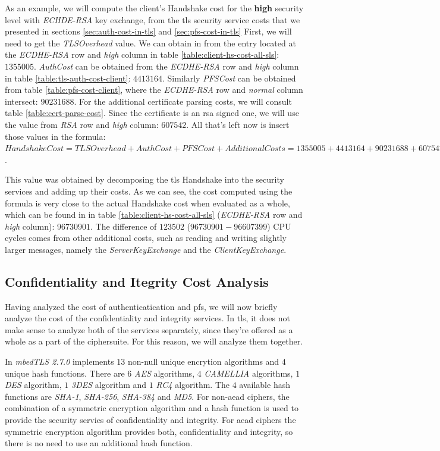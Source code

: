 \documentclass{llncs}
\begin{document}
As an example, we will compute the client's Handshake cost for the \textbf{high} security level with \textit{ECHDE-RSA}
key exchange, from the \gls{tls} security service costs that we presented in sections \ref{sec:auth-cost-in-tls} and \ref{sec:pfs-cost-in-tls}
First, we will need to get the \textit{TLSOverhead} value. We can obtain in from the entry located at the
\textit{ECDHE-RSA} row and \textit{high} column in table \ref{table:client-hs-cost-all-sls}: $1355005$. \textit{AuthCost} can be obtained
from the \textit{ECDHE-RSA} row and \textit{high} column in table \ref{table:tls-auth-cost-client}: $4413164$. Similarly \textit{PFSCost}
can be obtained from table \ref{table:pfs-cost-client}, where the \textit{ECDHE-RSA} row and \textit{normal} column intersect: $90231688$.
For the additional certificate parsing costs, we will consult table \ref{table:cert-parse-cost}. Since the certificate is an \gls{rsa} signed one,
we will use the value from \textit{RSA} row and \textit{high} column: $607542$. All that's left now is insert those values in the formula:
$Handshake Cost = TLS Overhead + Auth Cost + PFS Cost + Additional Costs = 1355005 + 4413164 + 90231688 + 607542 = 96607399$.

This value was obtained by decomposing the \gls{tls} Handshake into the security services and adding up their costs. As we can see,
the cost computed using the formula is very close to the actual Handshake cost when evaluated as a whole,
which can be found in in table \ref{table:client-hs-cost-all-sls} (\textit{ECDHE-RSA} row and \textit{high} column): $96730901$.
The difference of $123502$ ($96730901-96607399$) CPU cycles comes from other additional costs, such as reading and writing slightly larger
messages, namely the \textit{ServerKeyExchange} and the \textit{ClientKeyExchange}.

\subsection{Confidentiality and Itegrity Cost Analysis} \label{sec:confid-costs}

Having analyzed the cost of authenticatication and \gls{pfs}, we will now briefly analyze the cost of the confidentiality and integrity services.
In \gls{tls}, it does not make sense to analyze both of the services separately, since they're offered as a whole as a part of the ciphersuite.
For this reason, we will analyze them together.

In \textit{mbedTLS 2.7.0} implements $13$ non-null unique encrytion algorithms and $4$ unique hash functions. There are $6$ \textit{AES} 
algorithms, $4$ \textit{CAMELLIA} algorithms,
$1$ \textit{DES} algorithm, $1$ \textit{3DES} algorithm and $1$ \textit{RC4} algorithm. The $4$ available hash functions are \textit{SHA-1}, 
\textit{SHA-256}, \textit{SHA-384} and \textit{MD5}.
For non-\gls{aead} ciphers, the combination of a symmetric encryption algorithm and a hash function is used to provide the security servies of confidentiality and 
integrity. For \gls{aead} ciphers the symmetric encryption algorithm provides both, confidentiality and integrity, so there is no need
to use an additional hash function.
\end{document}
